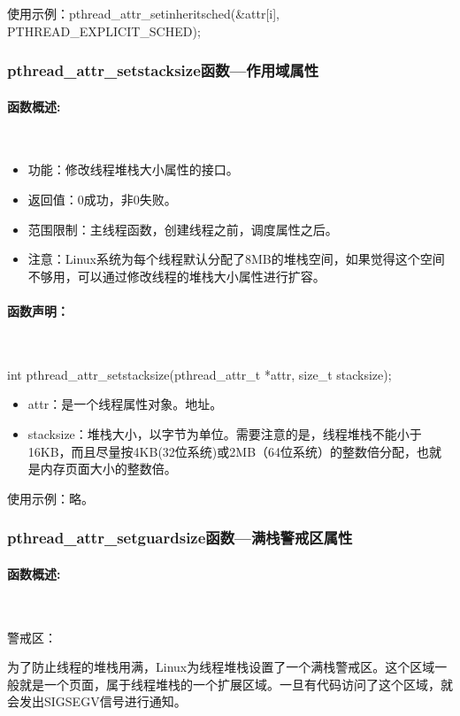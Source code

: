 \documentclass[UTF8]{article}%
\begin{document}
使用示例：pthread\_attr\_setinheritsched(\&attr[i], PTHREAD\_EXPLICIT\_SCHED);

\subsubsection{pthread\_attr\_setstacksize函数---作用域属性}

\paragraph{函数概述:}~{}

\begin{itemize}
    \item 功能：修改线程堆栈大小属性的接口。
    \item 返回值：0成功，非0失败。
    \item 范围限制：主线程函数，创建线程之前，调度属性之后。
    \item 注意：Linux系统为每个线程默认分配了8MB的堆栈空间，如果觉得这个空间不够用，可以通过修改线程的堆栈大小属性进行扩容。 
\end{itemize}

\paragraph{函数声明：}~{}

int pthread\_attr\_setstacksize(pthread\_attr\_t *attr, size\_t stacksize); 

\begin{itemize}
    \item attr：是一个线程属性对象。地址。
    \item stacksize：堆栈大小，以字节为单位。需要注意的是，线程堆栈不能小于16KB，而且尽量按4KB(32位系统)或2MB（64位系统）的整数倍分配，也就是内存页面大小的整数倍。
\end{itemize}

使用示例：略。

\subsubsection{pthread\_attr\_setguardsize函数---满栈警戒区属性}

\paragraph{函数概述:}~{}

警戒区：

为了防止线程的堆栈用满，Linux为线程堆栈设置了一个满栈警戒区。这个区域一般就是一个页面，属于线程堆栈的一个扩展区域。一旦有代码访问了这个区域，就会发出SIGSEGV信号进行通知。
\end{document}
